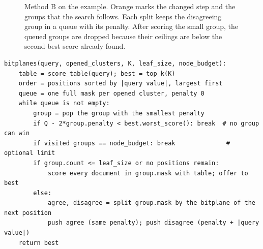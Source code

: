 \begin{figure}[H]\centering
{}
\caption{Method B on the example. Orange marks the changed step and the groups that the
search follows. Each split keeps the disagreeing group in a queue with its penalty. After
scoring the small group, the queued groups are dropped because their ceilings are below the
second-best score already found.}
\label{fig:bitplane-search}
\end{figure}

\begin{lstlisting}
bitplanes(query, opened_clusters, K, leaf_size, node_budget):
    table = score_table(query); best = top_k(K)
    order = positions sorted by |query value|, largest first
    queue = one full mask per opened cluster, penalty 0
    while queue is not empty:
        group = pop the group with the smallest penalty
        if Q - 2*group.penalty < best.worst_score(): break  # no group can win
        if visited groups == node_budget: break              # optional limit
        if group.count <= leaf_size or no positions remain:
            score every document in group.mask with table; offer to best
        else:
            agree, disagree = split group.mask by the bitplane of the next position
            push agree (same penalty); push disagree (penalty + |query value|)
    return best
\end{lstlisting}

